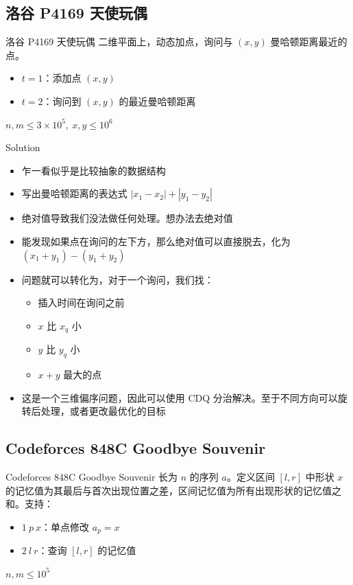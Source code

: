 ﻿\documentclass[aspectratio=169,handout]{ctexbeamer}
\begin{document}
\subsection{洛谷 P4169 天使玩偶}
\begin{frame}{洛谷 P4169 天使玩偶}
    二维平面上，动态加点，询问与 $(x,y)$ 曼哈顿距离最近的点。
    \begin{itemize}
        \item $t=1$：添加点 $(x,y)$
        \item $t=2$：询问到 $(x,y)$ 的最近曼哈顿距离
    \end{itemize}
    
    $n,m\le 3\times10^5,\ x,y\le 10^6$
\end{frame}

\begin{frame}{Solution}
    \begin{itemize}
        \item 乍一看似乎是比较抽象的数据结构
        \item 写出曼哈顿距离的表达式 $|x_1-x_2|+|y_1-y_2|$
        \item 绝对值导致我们没法做任何处理。想办法去绝对值
        \item 能发现如果点在询问的左下方，那么绝对值可以直接脱去，化为 $(x_1+y_1)-(y_1+y_2)$
        \item 问题就可以转化为，对于一个询问，我们找：
        \begin{itemize}
            \item 插入时间在询问之前
            \item $x$ 比 $x_q$ 小
            \item $y$ 比 $y_q$ 小
            \item $x+y$ 最大的点
        \end{itemize}
        \item 这是一个三维偏序问题，因此可以使用 CDQ 分治解决。至于不同方向可以旋转后处理，或者更改最优化的目标
    \end{itemize}
\end{frame}
















\subsection{Codeforces 848C Goodbye Souvenir}
\begin{frame}{Codeforces 848C Goodbye Souvenir}
    长为 $n$ 的序列 $a$。定义区间 $[l,r]$ 中形状 $x$ 的记忆值为其最后与首次出现位置之差，区间记忆值为所有出现形状的记忆值之和。支持：
    \begin{itemize}
        \item $1\ p\ x$：单点修改 $a_p=x$
        \item $2\ l\ r$：查询 $[l,r]$ 的记忆值
    \end{itemize}
    
    $n,m\le 10^5$
\end{frame}
\end{document}
